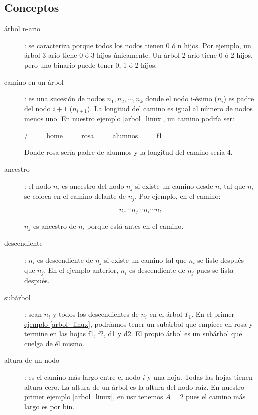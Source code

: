 \documentclass[10pt,a4paper,spanish]{report}
\begin{document}
\subsection{\textcolor[rgb]{0.3,0.4,0.8}Conceptos}
\begin{description}
\item[árbol n-ario]: se caracteriza porque todos los nodos tienen 0 ó n hijos. Por ejemplo, un árbol 3-ario tiene 0 ó 3 hijos únicamente. Un árbol 2-ario tiene 0 ó 2 hijos, pero uno binario puede tener 0, 1 ó 2 hijos.

\item[camino en un árbol]: es una sucesión de nodos $n_{1},n_{2},\cdots,n_{k}$ donde el nodo i-ésimo ($n_{i}$) es padre del nodo $i+1$ ($n_{i+1}$). 
La longitud del camino es igual al número de nodos menos uno. En nuestro \hyperref[arbol_linux]{ejemplo \ref*{arbol_linux}}, un camino podría ser:
\begin{center}
/ $\qquad$ home $\qquad$ rosa $\qquad$ alumnos $\qquad$ f1
\end{center}
Donde rosa sería padre de alumnos y la longitud del camino sería 4.

\item[ancestro]: el nodo $n_{i}$ es ancestro del nodo $n_{j}$ si existe un camino desde $n_{i}$ tal que $n_{i}$ se coloca en el camino delante de $n_{j}$. Por ejemplo, en el camino:
\begin{center}
\begin{displaymath}
n_{s} \cdots n_{j} \cdots n_{i} \cdots n_{l}
\end{displaymath}
\end{center}
$n_{j}$ es ancestro de $n_{i}$ porque está antes en el camino.

\item[descendiente]: $n_{i}$ es descendiente de $n_{j}$ si existe un camino tal que $n_{i}$ se liste después que $n_{j}$. En el ejemplo anterior, $n_{i}$ es descendiente de $n_{j}$ pues se lista después.

\item[subárbol]: sean $n_{i}$ y todos los descendientes de $n_{i}$ en el árbol $T_{1}$. En el primer \hyperref[arbol_linux]{ejemplo \ref*{arbol_linux}}, podríamos tener un subárbol que empiece en rosa y termine en las hojas f1, f2, d1 y d2. El propio árbol es un subárbol que cuelga de él mismo.

\label{def_altura}
\item[altura de un nodo]: es el camino más largo entre el nodo $i$ y una hoja. Todas las hojas tienen altura cero. La altura de un árbol es la altura del nodo raíz. En nuestro primer \hyperref[arbol_linux]{ejemplo \ref*{arbol_linux}}, en usr tenemos $A=2$ pues el camino más largo es por bin. 


\end{description}
\end{document}
